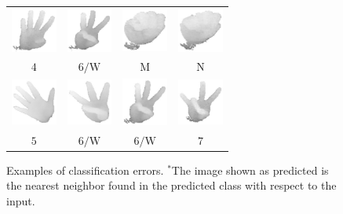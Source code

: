 \documentclass[a4paper]{article}
\begin{document}
\begin{figure}
\begin{tabular}{cccc}
\includegraphics[width=1.5cm]{img/S01_C04_0118.eps} & 
\includegraphics[width=1.5cm]{img/S01_C06_0014.eps} & 
\includegraphics[width=1.5cm]{img/S01_C21_0058.eps} & 
\includegraphics[width=1.5cm]{img/S01_C22_0123.eps} \\
$\text{4}$ & $\text{6/W}$ & $\text{M}$ & $\text{N}$ \\

\includegraphics[width=1.5cm]{img/S04_C05_0138.eps} & 
\includegraphics[width=1.5cm]{img/S04_C06_0073.eps} & 
\includegraphics[width=1.5cm]{img/S01_C06_0015.eps} & 
\includegraphics[width=1.5cm]{img/S01_C07_0013.eps} \\
$\text{5}$ & $\text{6/W}$ & $\text{6/W}$ & $\text{7}$ \\

\end{tabular}
\caption{Examples of classification errors. $^*$The image shown as predicted is
the nearest neighbor found in the predicted class with respect to the input.}
\label{fig:errors}
\end{figure}
\end{document}

